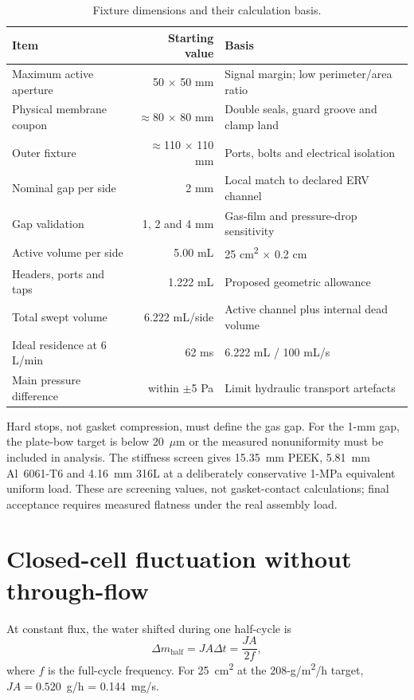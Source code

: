 \documentclass[10pt,a4paper]{article}
\begin{document}
\begin{table}[htbp]
\centering
\caption{Fixture dimensions and their calculation basis.}
\begin{tabularx}{\textwidth}{@{}Y R Y@{}}
\toprule
Item & Starting value & Basis \\
\midrule
Maximum active aperture & 50 $\times$ 50 mm & Signal margin; low perimeter/area ratio \\
Physical membrane coupon & $\approx$80 $\times$ 80 mm & Double seals, guard groove and clamp land \\
Outer fixture & $\approx$110 $\times$ 110 mm & Ports, bolts and electrical isolation \\
Nominal gap per side & 2 mm & Local match to declared ERV channel \\
Gap validation & 1, 2 and 4 mm & Gas-film and pressure-drop sensitivity \\
Active volume per side & 5.00 mL & 25 cm\textsuperscript{2} $\times$ 0.2 cm \\
Headers, ports and taps & 1.222 mL & Proposed geometric allowance \\
Total swept volume & 6.222 mL/side & Active channel plus internal dead volume \\
Ideal residence at 6 L/min & 62 ms & 6.222 mL / 100 mL/s \\
Main pressure difference & within $\pm$5 Pa & Limit hydraulic transport artefacts \\
\bottomrule
\end{tabularx}
\end{table}

Hard stops, not gasket compression, must define the gas gap. For the 1-mm gap,
the plate-bow target is below 20~$\mu$m or the measured nonuniformity must be
included in analysis. The stiffness screen gives 15.35~mm PEEK, 5.81~mm
Al~6061-T6 and 4.16~mm 316L at a deliberately conservative 1-MPa equivalent
uniform load. These are screening values, not gasket-contact calculations;
final acceptance requires measured flatness under the real assembly load.

\section{Closed-cell fluctuation without through-flow}

At constant flux, the water shifted during one half-cycle is
\[
\Delta m_{\mathrm{half}}=JA\Delta t=\frac{JA}{2f},
\]
where $f$ is the full-cycle frequency. For 25~cm\textsuperscript{2} at the
208-g/m\textsuperscript{2}/h target, $JA=0.520$~g/h = 0.144~mg/s.
\end{document}

